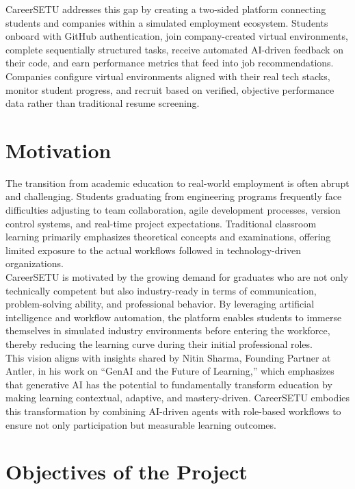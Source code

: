 \documentclass[12pt,a4paper]{report}
\begin{document}
CareerSETU addresses this gap by creating a two-sided platform connecting students and companies within a simulated employment ecosystem. Students onboard with GitHub authentication, join company-created virtual environments, complete sequentially structured tasks, receive automated AI-driven feedback on their code, and earn performance metrics that feed into job recommendations. Companies configure virtual environments aligned with their real tech stacks, monitor student progress, and recruit based on verified, objective performance data rather than traditional resume screening.

\section{Motivation}

The transition from academic education to real-world employment is often abrupt and
challenging. Students graduating from engineering programs frequently face difficulties
adjusting to team collaboration, agile development processes, version control systems,
and real-time project expectations. Traditional classroom learning primarily emphasizes
theoretical concepts and examinations, offering limited exposure to the actual workflows
followed in technology-driven organizations.\\[0.1cm]

CareerSETU is motivated by the growing demand for graduates who are not only technically
competent but also industry-ready in terms of communication, problem-solving ability,
and professional behavior. By leveraging artificial intelligence and workflow automation,
the platform enables students to immerse themselves in simulated industry environments
before entering the workforce, thereby reducing the learning curve during their initial
professional roles.\\[0.1cm]

This vision aligns with insights shared by Nitin Sharma, Founding Partner at Antler, in
his work on ``GenAI and the Future of Learning,'' which emphasizes that generative AI has
the potential to fundamentally transform education by making learning contextual,
adaptive, and mastery-driven. CareerSETU embodies this transformation by combining
AI-driven agents with role-based workflows to ensure not only participation but measurable
learning outcomes.

\section{Objectives of the Project}
\end{document}
